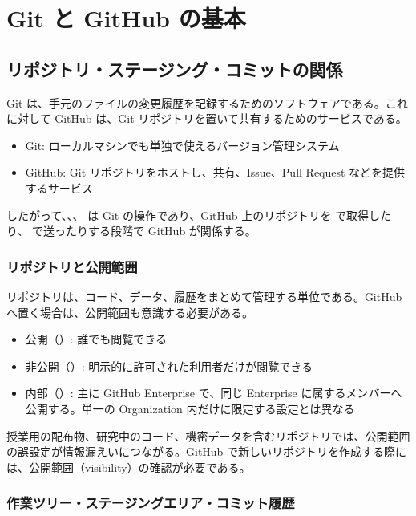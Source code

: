 \chapter{Git と GitHub の基本}
\label{app:git}

\section{リポジトリ・ステージング・コミットの関係}

Git は、手元のファイルの変更履歴を記録するためのソフトウェアである。これに対して GitHub は、Git リポジトリを置いて共有するためのサービスである。

\begin{itemize}
\item Git: ローカルマシンでも単独で使えるバージョン管理システム
\item GitHub: Git リポジトリをホストし、共有、Issue、Pull Request などを提供するサービス
\end{itemize}

したがって、、、 は Git の操作であり、GitHub 上のリポジトリを  で取得したり、 で送ったりする段階で GitHub が関係する。

\subsection{リポジトリと公開範囲}

リポジトリは、コード、データ、履歴をまとめて管理する単位である。GitHub へ置く場合は、公開範囲も意識する必要がある。

\begin{itemize}
\item 公開（）: 誰でも閲覧できる
\item 非公開（）: 明示的に許可された利用者だけが閲覧できる
\item 内部（）: 主に GitHub Enterprise で、同じ Enterprise に属するメンバーへ公開する。単一の Organization 内だけに限定する設定とは異なる
\end{itemize}

授業用の配布物、研究中のコード、機密データを含むリポジトリでは、公開範囲の誤設定が情報漏えいにつながる。GitHub で新しいリポジトリを作成する際には、公開範囲（visibility）の確認が必要である。

\subsection{作業ツリー・ステージングエリア・コミット履歴}

